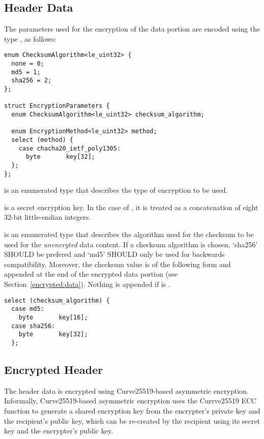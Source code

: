 \subsection{Header Data}\label{header:data}

The parameters used for the encryption of the data portion are encoded using the type , as follows:

\begin{verbatim}
enum ChecksumAlgorithm<le_uint32> {
  none = 0;
  md5 = 1;
  sha256 = 2;
};

struct EncryptionParameters {
  enum ChecksumAlgorithm<le_uint32> checksum_algorithm;

  enum EncryptionMethod<le_uint32> method;
  select (method) {
    case chacha20_ietf_poly1305:
      byte       key[32];
  };
};
\end{verbatim}

 is an enumerated type that describes the type of encryption to be used.

 is a secret encryption key.
%
In the case of , it is treated as a concatenation of eight 32-bit little-endian integers.

 is an enumerated type that describes the algorithm used for the checksum to be used for the \emph{unencryted} data content.
%
If a checksum algorithm is chosen, `sha256' SHOULD be prefered and `md5' SHOULD only be used for backwards compatibility.
%
Moreover, the checksum value is of the following form and appended at the end of the encrypted data portion (see Section~\ref{encrypted:data}). Nothing is appended if  is .
%
\begin{verbatim}
select (checksum_algorithm) {
  case md5:
    byte       key[16];
  case sha256:
    byte       key[32];
  };
\end{verbatim}

\subsection{Encrypted Header}\label{header:encrypted}

The header data is encrypted using Curve25519-based asymmetric encryption.
%
Informally, Curve25519-based asymmetric encryption uses the Currve25519 ECC function to generate a shared encryption key from the encrypter's private key and the recipient's public key, which can be re-created by the recipient using its secret key and the encrypter's public key.
%

